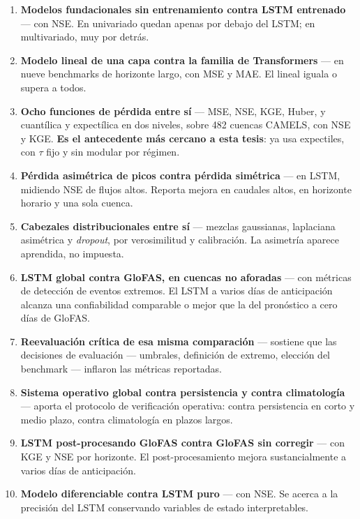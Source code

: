 \documentclass{../comun/tesisuba}
\newcommand{\entrada}[2]{\item \textbf{#1} --- #2}
\begin{document}
\begin{enumerate}[leftmargin=*, itemsep=4pt]
\entrada{Modelos fundacionales sin entrenamiento contra LSTM entrenado}{con NSE. En univariado
quedan apenas por debajo del LSTM; en multivariado, muy por detrás.
\citet{sun-2026-tsfm-zeroshot-caudal}}

\entrada{Modelo lineal de una capa contra la familia de Transformers}{en nueve benchmarks de
horizonte largo, con MSE y MAE. El lineal iguala o supera a todos.
\citet{zeng-2023-dlinear}}

\entrada{Ocho funciones de pérdida entre sí}{MSE, NSE, KGE, Huber, y cuantílica y expectílica en
dos niveles, sobre 482 cuencas CAMELS, con NSE y KGE. \textbf{Es el antecedente más cercano a esta
tesis}: ya usa expectiles, con $\tau$ fijo y sin modular por régimen.
\citet{dahal-2026-ensemble-diverse-loss-functions}}

\entrada{Pérdida asimétrica de picos contra pérdida simétrica}{en LSTM, midiendo NSE de flujos
altos. Reporta mejora en caudales altos, en horizonte horario y una sola cuenca.
\citet{tofighi-2025-asymmetric-peak-loss}}

\entrada{Cabezales distribucionales entre sí}{mezclas gaussianas, laplaciana asimétrica y
\textit{dropout}, por verosimilitud y calibración. La asimetría aparece aprendida, no impuesta.
\citet{klotz-2022-uncertainty-deep-learning-rainfall-runoff}}

\entrada{LSTM global contra GloFAS, en cuencas no aforadas}{con métricas de detección de eventos
extremos. El LSTM a varios días de anticipación alcanza una confiabilidad comparable o mejor que
la del pronóstico a cero días de GloFAS. \citet{nearing-2024-global-extreme-floods}}

\entrada{Reevaluación crítica de esa misma comparación}{sostiene que las decisiones de evaluación
--- umbrales, definición de extremo, elección del benchmark --- inflaron las métricas reportadas.
\citet{li-2026-critica-despliegue-ia}}

\entrada{Sistema operativo global contra persistencia y contra climatología}{aporta el protocolo
de verificación operativa: contra persistencia en corto y medio plazo, contra climatología en
plazos largos. \citet{harrigan-2023-glofas-reforecast}}

\entrada{LSTM post-procesando GloFAS contra GloFAS sin corregir}{con KGE y NSE por horizonte. El
post-procesamiento mejora sustancialmente a varios días de anticipación.
\citet{hunt-2022-lstm-refuerzo-pronosticos}}

\entrada{Modelo diferenciable contra LSTM puro}{con NSE. Se acerca a la precisión del LSTM
conservando variables de estado interpretables. \citet{feng-2022-modelos-diferenciables}}


\end{enumerate}
\end{document}
